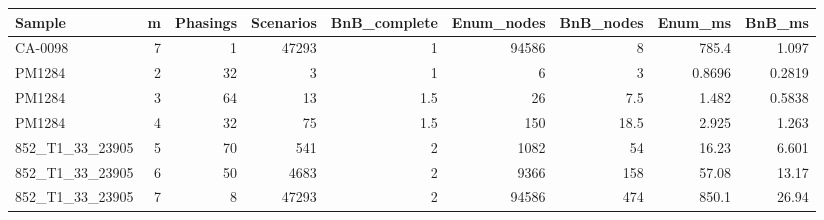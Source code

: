 \begin{tabular}{lrrrrrrrr}
\toprule
Sample & m & Phasings & Scenarios & BnB\_complete & Enum\_nodes & BnB\_nodes & Enum\_ms & BnB\_ms \\
\midrule
CA-0098 & 7 & 1 & 47293 & 1 & 94586 & 8 & 785.4 & 1.097 \\
PM1284 & 2 & 32 & 3 & 1 & 6 & 3 & 0.8696 & 0.2819 \\
PM1284 & 3 & 64 & 13 & 1.5 & 26 & 7.5 & 1.482 & 0.5838 \\
PM1284 & 4 & 32 & 75 & 1.5 & 150 & 18.5 & 2.925 & 1.263 \\
852\_T1\_33\_23905 & 5 & 70 & 541 & 2 & 1082 & 54 & 16.23 & 6.601 \\
852\_T1\_33\_23905 & 6 & 50 & 4683 & 2 & 9366 & 158 & 57.08 & 13.17 \\
852\_T1\_33\_23905 & 7 & 8 & 47293 & 2 & 94586 & 474 & 850.1 & 26.94 \\
\bottomrule
\end{tabular}
